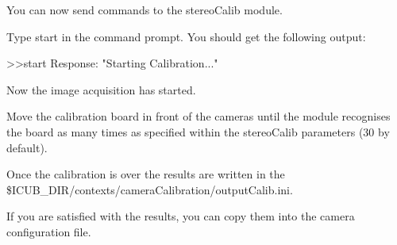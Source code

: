 You can now send commands to the stereo\+Calib module.
\begin{DoxyItemize}
\item Type {\ttfamily start} in the command prompt. You should get the following output\+: \begin{DoxyVerb}    >>start
    Response: "Starting Calibration..."
\end{DoxyVerb}

\end{DoxyItemize}

Now the image acquisition has started.
\begin{DoxyItemize}
\item Move the calibration board in front of the cameras until the module recognises the board as many times as specified within the stereo\+Calib parameters (30 by default).
\item Once the calibration is over the results are written in the {\ttfamily \$\+I\+C\+U\+B\+\_\+\+D\+IR/contexts/camera\+Calibration/output\+Calib.ini}.
\item If you are satisfied with the results, you can copy them into the camera configuration file. 
\end{DoxyItemize}